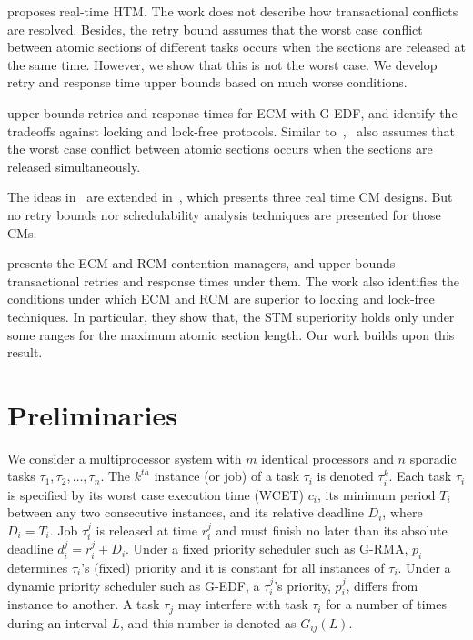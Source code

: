 \documentclass[conference]{IEEEtran}
\begin{document}
\cite{schoeberl2010rttm} proposes real-time HTM. The work does not describe how transactional conflicts are resolved. Besides, the retry bound assumes that the worst case conflict between atomic sections of different tasks occurs when the sections are released at the same time. However, we show that this is not the worst case. We develop retry and response time upper bounds based on much worse conditions.


\cite{key-1} upper bounds retries and response times for  ECM with G-EDF, and identify the tradeoffs against locking and lock-free protocols. Similar to~\cite{schoeberl2010rttm},~\cite{key-1} also assumes that the worst case conflict between atomic sections occurs when the sections are released simultaneously. 

The ideas in~\cite{key-1} are extended in~\cite{barrosmanaging}, which presents three real time CM designs. But no retry bounds nor schedulability analysis techniques are presented for those CMs. 

\cite{stmconcurrencycontrol:emsoft11} presents the ECM and RCM contention managers, and upper bounds transactional retries and response times under them. The work also identifies the conditions under which ECM and RCM are superior to locking and lock-free techniques. In particular, they show that, the STM superiority holds only under some ranges for the maximum atomic section length. Our work builds upon this result.

\section{Preliminaries}
\label{sec:model}

We consider a multiprocessor system with $m$ identical processors and $n$ sporadic tasks $\tau_1, \tau_2,\ldots, \tau_n$. The $k^{th}$ instance (or job) of a task $\tau_i$ is denoted $\tau_i^k$. Each task $\tau_i$ is specified by its worst case execution time (WCET) $c_i$, its minimum period $T_i$ between any two consecutive instances, and its relative deadline $D_i$, where $D_i=T_i$. Job $\tau_i^j$ is released at time $r_i^j$ and must finish no later than its absolute deadline $d_i^j=r_i^j+D_i$. Under a fixed priority scheduler such as G-RMA, $p_i$ determines $\tau_i$'s (fixed) priority and it is constant for all instances of $\tau_i$. Under a dynamic priority scheduler such as G-EDF, a $\tau_i^j$'s priority, $p_i^j$, differs from  instance to another. 
A task $\tau_j$ may interfere with task $\tau_i$ for a number of times during an interval $L$, and this number is denoted as $G_{ij}(L)$. 
\end{document}

